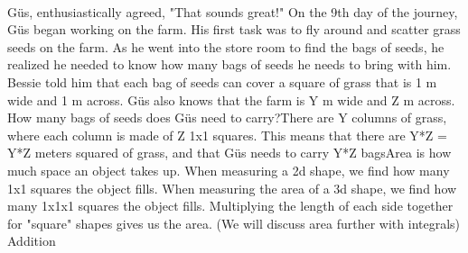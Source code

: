 \documentclass[a4paper,11pt ]{book}
\begin{document}
 \paragraph{} Güs, enthusiastically agreed, "That sounds great!"
{On the 9th day of the journey, Güs began working on the farm. His first task was to fly around and scatter grass seeds on the farm. As he went into the store room to find the bags of seeds, he realized he needed to know how many bags of seeds he needs to bring with him. Bessie told him that each bag of seeds can cover a square of grass that is 1 m wide and 1 m across. Güs also knows that the farm is Y m wide and Z m across. How many bags of seeds does Güs need to carry?}{There are Y columns of grass, where each column is made of Z 1x1 squares. This means that there are Y*Z = Y*Z meters squared of grass, and that Güs needs to carry Y*Z bags}{Area is how much space an object takes up. When measuring a 2d shape, we find how many 1x1 squares the object fills. When measuring the area of a 3d shape, we find how many 1x1x1 squares the object fills. Multiplying the length of each side together for "square" shapes gives us the area. (We will discuss area further with integrals)
}{Addition}
\end{document}

